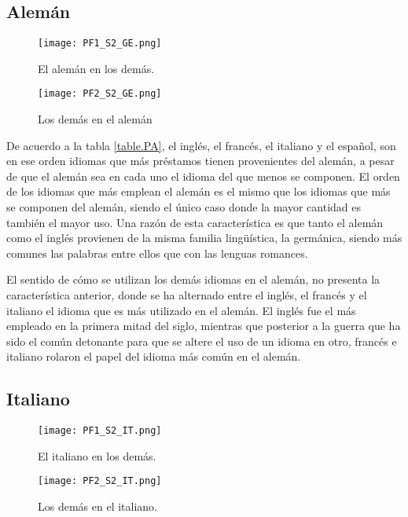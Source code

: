 \subsection{Alemán} %

\begin{figure}[h!]
	\centering
	\texttt{[image: PF1\_S2\_GE.png]}
	\label{fig.ST_a_GE}
	\caption{El alemán en los demás.}
\end{figure}


\begin{figure}[h!]
	\centering
	\texttt{[image: PF2\_S2\_GE.png]}
	\label{fig.ST_b_GE}
	\caption{Los demás en el alemán}
\end{figure}



De acuerdo a la tabla \ref{table.PA},  el inglés, el francés, el italiano y el español, son en ese orden idiomas que más préstamos tienen provenientes del alemán, a pesar de que el alemán sea en cada uno el idioma del que menos se componen.  El orden de los idiomas que más emplean el alemán es el mismo que los idiomas que más se componen del alemán, siendo el único caso donde la mayor cantidad es también el mayor uso. Una razón de esta característica es que tanto el alemán como el inglés provienen de la misma familia lingüística, la germánica,  siendo más comunes las palabras entre ellos  que con las lenguas romances.

El sentido de cómo se utilizan los demás idiomas en el alemán, no presenta la característica anterior,   donde se ha alternado entre el inglés, el francés y el italiano el idioma que es más utilizado en el alemán.  El inglés fue el más empleado en la primera mitad del siglo, mientras que posterior a la guerra que ha sido el común detonante para que se altere el uso de un idioma en otro,  francés e italiano rolaron el papel del idioma más común en el alemán. 


\subsection{Italiano} %

\begin{figure}
	\centering
	\texttt{[image: PF1\_S2\_IT.png]}
	\label{fig.ST_a_IT}
	\caption{El italiano en los demás.}
\end{figure}
		
\begin{figure}[h!]
	\centering
	\texttt{[image: PF2\_S2\_IT.png]}
	\label{fig.ST_b_IT}
	\caption{Los demás en el italiano.}
\end{figure}


